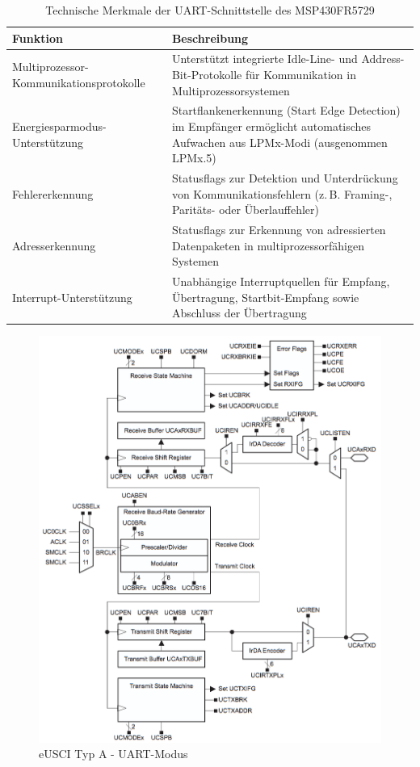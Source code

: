 \begin{table}[h!]
	\small
	\centering
	\begin{tabular}{|p{6.5cm}|p{7cm}|}
		\hline
		\textbf{Funktion} & \textbf{Beschreibung} \\
		\hline
		Multiprozessor-Kommunikationsprotokolle & Unterstützt integrierte Idle-Line- und Address-Bit-Protokolle für Kommunikation in Multiprozessorsystemen \\
		\hline
		Energiesparmodus-Unterstützung & Startflankenerkennung (Start Edge Detection) im Empfänger ermöglicht automatisches Aufwachen aus LPMx-Modi (ausgenommen LPMx.5) \\
		\hline
		Fehlererkennung & Statusflags zur Detektion und Unterdrückung von Kommunikationsfehlern (z.\,B. Framing-, Paritäts- oder Überlauffehler) \\
		\hline
		Adresserkennung & Statusflags zur Erkennung von adressierten Datenpaketen in multiprozessorfähigen Systemen \\
		\hline
		Interrupt-Unterstützung & Unabhängige Interruptquellen für Empfang, Übertragung, Startbit-Empfang sowie Abschluss der Übertragung \\
		\hline
	\end{tabular}
	\caption{Technische Merkmale der UART-Schnittstelle des MSP430FR5729\\}
	\label{tab:uart_features}
\end{table}

\newpage
\begin{figure}[h!]
	\centering
	\includegraphics[width=1.0\textwidth]{../Bilder/eUSCI_UART.png}
	\caption{eUSCI Typ A - UART-Modus\\}
	\label{fig:BlockDiagramm_eUSCI_A_UART}
\end{figure}

